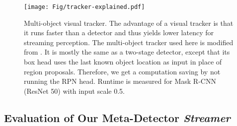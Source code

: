 \begin{figure}[!h]
\centering
\texttt{[image: Fig/tracker-explained.pdf]}
\vspace{-0.5em}
\caption{Multi-object visual tracker. The advantage of a visual tracker is that it runs faster than a detector and thus yields lower latency for streaming perception. The multi-object tracker used here is modified from \cite{Bergmann2019TrackingWB}. It is mostly the same as a two-stage detector, except that its box head uses the last known object location as input in place of region proposals. Therefore, we get a computation saving by not running the RPN head. Runtime is measured for Mask R-CNN (ResNet 50) with input scale 0.5.}
\label{fig:tracker}
\vspace{-1em}
\end{figure}

\subsection{Evaluation of Our Meta-Detector {\em Streamer}}
\label{app:metaalg}

